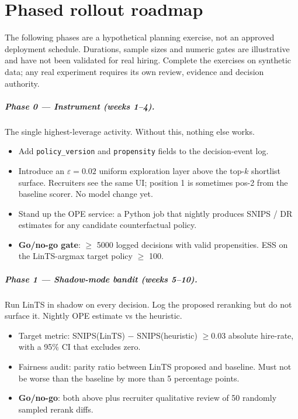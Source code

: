 \documentclass[11pt,oneside]{scrbook}
\begin{document}


\chapter{Phased rollout roadmap}

The following phases are a hypothetical planning exercise, not an approved deployment schedule. Durations, sample sizes and numeric gates are illustrative and have not been validated for real hiring. Complete the exercises on synthetic data; any real experiment requires its own review, evidence and decision authority.

\paragraph{Phase 0 --- Instrument (weeks 1--4).}
The single highest-leverage activity. Without this, nothing else works.

\begin{itemize}
  \item Add \texttt{policy\_version} and \texttt{propensity} fields to
        the decision-event log.
  \item Introduce an $\varepsilon=0.02$ uniform exploration layer above
        the top-$k$ shortlist surface. Recruiters see the same UI;
        position 1 is sometimes pos-2 from the baseline scorer. No model
        change yet.
  \item Stand up the OPE service: a Python job that nightly produces
        SNIPS / DR estimates for any candidate counterfactual policy.
  \item \textbf{Go/no-go gate}: $\ge$ 5000 logged decisions with valid
        propensities. ESS on the LinTS-argmax target policy $\ge$ 100.
\end{itemize}

\paragraph{Phase 1 --- Shadow-mode bandit (weeks 5--10).}
Run LinTS in shadow on every decision. Log the proposed reranking but do
not surface it. Nightly OPE estimate vs the heuristic.

\begin{itemize}
  \item Target metric: SNIPS(LinTS) $-$ SNIPS(heuristic) $\ge 0.03$
        absolute hire-rate, with a 95\% CI that excludes zero.
  \item Fairness audit: parity ratio between LinTS proposed and
        baseline. Must not be worse than the baseline by more than 5
        percentage points.
  \item \textbf{Go/no-go}: both above plus recruiter qualitative review
        of 50 randomly sampled rerank diffs.
\end{itemize}
\end{document}
